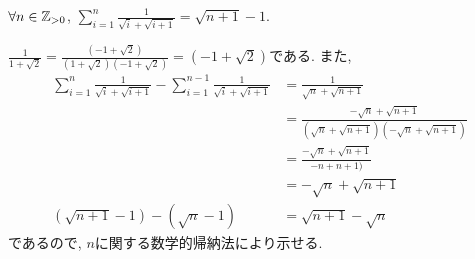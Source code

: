 \begin{prop}
  \label{p:20230731}
  $\forall n\in \mathbb{Z}_{>0}$,
  $\sum_{i=1}^n \frac{1}{\sqrt{i}+\sqrt{i+1}}=\sqrt{n+1}-1$.
\end{prop}
\begin{proof**}
  $\frac{1}{1+\sqrt{2}}=\frac{(-1+\sqrt{2})}{(1+\sqrt{2})(-1+\sqrt{2})}=(-1+\sqrt{2})$である.
  また,
  \begin{align*}
    \sum_{i=1}^n \frac{1}{\sqrt{i}+\sqrt{i+1}}-\sum_{i=1}^{n-1} \frac{1}{\sqrt{i}+\sqrt{i+1}}
    &=\frac{1}{\sqrt{n}+\sqrt{n+1}}\\
    &=\frac{-\sqrt{n}+\sqrt{n+1}}{(\sqrt{n}+\sqrt{n+1})(-\sqrt{n}+\sqrt{n+1})}\\
    &=\frac{-\sqrt{n}+\sqrt{n+1}}{-n+n+1)}\\
    &=-\sqrt{n}+\sqrt{n+1}\\
    (\sqrt{n+1}-1)-(\sqrt{n}-1)&=\sqrt{n+1}-\sqrt{n}
  \end{align*}
  であるので,
  $n$に関する数学的帰納法により示せる.
\end{proof**}

